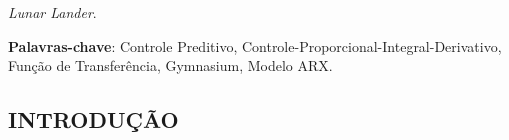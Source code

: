 \documentclass[12pt,           %
a4paper,                       %
openany,                       %
oneside,                       %
chapter=TITLE,                 %
english,                       %
spanish,                       %
brazil,                        %
sumario=tradicional]{abntex2}  %
\begin{document}
\begin{OnehalfSpace}
\textit{Lunar Lander}.

\end{OnehalfSpace}                                  %
\begin{DoubleSpace}                                 %
	\setlength{\parindent}{0pt}                     %
	
	\textbf{Palavras-chave}: Controle Preditivo, Controle-Proporcional-Integral-Derivativo, Função de Transferência, Gymnasium, Modelo ARX.

\end{DoubleSpace}                                   %
\begin{OnehalfSpace}                                %
\newpage
{}

\renewcommand{\listfigurename}{LISTA DE FIGURAS}
\renewcommand{\listtablename}{LISTA DE TABELAS}
\renewcommand{\bibname}{REFERÊNCIAS BIBLIOGRÁFICAS}

		
\tableofcontents*
\cleardoublepage
\newpage



\listoffigures
\cleardoublepage


\listoftables
\cleardoublepage


{\let\clearpage\relax\par \chapter{INTRODUÇÃO}}
\label{ch:introducao}                       %
\textual                                    %
\pagestyle{fancy}							%
\lfoot{} \rfoot{} \cfoot{} \chead{}
\rhead{\hfill \small \thepage} \lhead{}				
\renewcommand{\headrulewidth}{0pt}			%


\end{OnehalfSpace}
\end{document}
